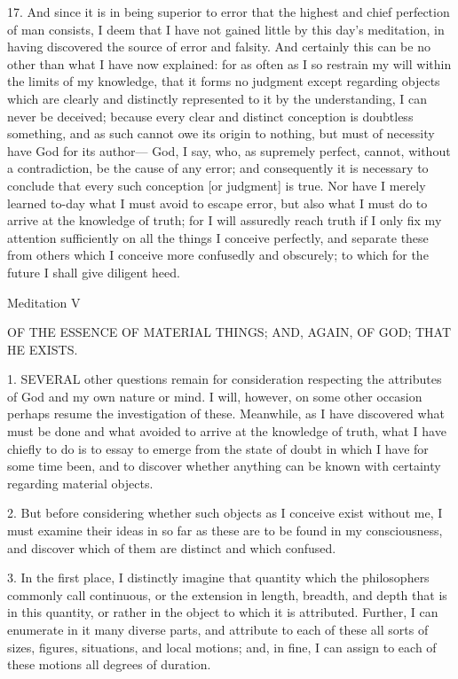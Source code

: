 17. And since it is in being superior to error that the highest and chief perfection of man consists, I deem that I have not gained little by this day's meditation, in having discovered the source of error and falsity. And certainly this can be no other than what I have now explained: for as often as I so restrain my will within the limits of my knowledge, that it forms no judgment except regarding objects which are clearly and distinctly represented to it by the understanding, I can never be deceived; because every clear and distinct conception is doubtless something, and as such cannot owe its origin to nothing, but must of necessity have God for its author— God, I say, who, as supremely perfect, cannot, without a contradiction, be the cause of any error; and consequently it is necessary to conclude that every such conception [or judgment] is true. Nor have I merely learned to-day what I must avoid to escape error, but also what I must do to arrive at the knowledge of truth; for I will assuredly reach truth if I only fix my attention sufficiently on all the things I conceive perfectly, and separate these from others which I conceive more confusedly and obscurely; to which for the future I shall give diligent heed.

Meditation V


OF THE ESSENCE OF MATERIAL THINGS; AND, AGAIN, OF GOD; THAT HE EXISTS.

1. SEVERAL other questions remain for consideration respecting the attributes of God and my own nature or mind. I will, however, on some other occasion perhaps resume the investigation of these. Meanwhile, as I have discovered what must be done and what avoided to arrive at the knowledge of truth, what I have chiefly to do is to essay to emerge from the state of doubt in which I have for some time been, and to discover whether anything can be known with certainty regarding material objects.

2. But before considering whether such objects as I conceive exist without me, I must examine their ideas in so far as these are to be found in my consciousness, and discover which of them are distinct and which confused.

3. In the first place, I distinctly imagine that quantity which the philosophers commonly call continuous, or the extension in length, breadth, and depth that is in this quantity, or rather in the object to which it is attributed. Further, I can enumerate in it many diverse parts, and attribute to each of these all sorts of sizes, figures, situations, and local motions; and, in fine, I can assign to each of these motions all degrees of duration.

